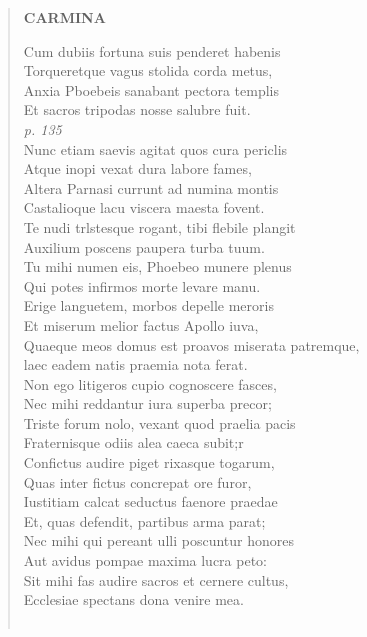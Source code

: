 \documentclass[11pt, a4paper]{report}
\begin{document}
\begin{verse}
    \begin{center} \textbf{CARMINA} \end{center} \marginpar{[210]} Cum dubiis fortuna suis penderet habenis \\ Torqueretque vagus stolida corda metus, \\ Anxia Pboebeis sanabant pectora templis \\ Et sacros tripodas nosse salubre fuit. \\ \textit{p. 135} \\ Nunc etiam saevis agitat quos cura periclis \\ Atque inopi vexat dura labore fames, \\ Altera Parnasi currunt ad numina montis \\ Castalioque lacu viscera maesta fovent. \\ Te nudi trlstesque rogant, tibi flebile plangit \\ Auxilium poscens paupera turba tuum. \\ Tu mihi numen eis, Phoebeo munere plenus \\ Qui potes infirmos morte levare manu. \\ Erige languetem, morbos depelle meroris \\ Et miserum melior factus Apollo iuva, \\ Quaeque meos domus est proavos miserata patremque, \\ laec eadem natis praemia nota ferat. \\ Non ego litigeros cupio cognoscere fasces, \\ Nec mihi reddantur iura superba precor; \\ Triste forum nolo, vexant quod praelia pacis \\ Fraternisque odiis alea caeca subit;r \\ Confictus audire piget rixasque togarum, \\ Quas inter fictus concrepat ore furor, \\ Iustitiam calcat seductus faenore praedae \\ Et, quas defendit, partibus arma parat; \\ Nec mihi qui pereant ulli poscuntur honores \\ Aut avidus pompae maxima lucra peto: \\ Sit mihi fas audire sacros et cernere cultus, \\ Ecclesiae spectans dona venire mea. \\ 
        ﻿\pagebreak 

\end{verse}
\end{document}
